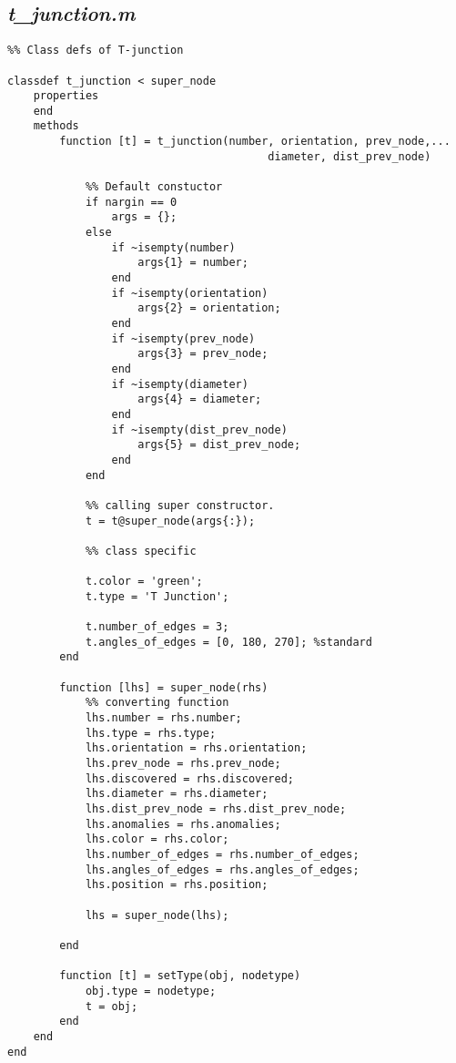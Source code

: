 \subsection{\emph{t\_junction.m}}

\begin{lstlisting}
%% Class defs of T-junction
 
classdef t_junction < super_node
    properties    
    end
    methods
        function [t] = t_junction(number, orientation, prev_node,...
                                        diameter, dist_prev_node)
            
            %% Default constuctor
            if nargin == 0
                args = {};
            else
                if ~isempty(number)
                    args{1} = number;
                end
                if ~isempty(orientation)
                    args{2} = orientation;
                end
                if ~isempty(prev_node)
                    args{3} = prev_node;
                end
                if ~isempty(diameter)
                    args{4} = diameter;
                end
                if ~isempty(dist_prev_node)
                    args{5} = dist_prev_node;
                end
            end
            
            %% calling super constructor.
            t = t@super_node(args{:});
            
            %% class specific
            
            t.color = 'green';
            t.type = 'T Junction';
            
            t.number_of_edges = 3;
            t.angles_of_edges = [0, 180, 270]; %standard  
        end
        
        function [lhs] = super_node(rhs)
            %% converting function
            lhs.number = rhs.number;
            lhs.type = rhs.type;
            lhs.orientation = rhs.orientation;
            lhs.prev_node = rhs.prev_node;
            lhs.discovered = rhs.discovered;
            lhs.diameter = rhs.diameter;
            lhs.dist_prev_node = rhs.dist_prev_node;
            lhs.anomalies = rhs.anomalies;
            lhs.color = rhs.color;
            lhs.number_of_edges = rhs.number_of_edges;
            lhs.angles_of_edges = rhs.angles_of_edges;
            lhs.position = rhs.position;
            
            lhs = super_node(lhs);
            
        end
        
        function [t] = setType(obj, nodetype)
            obj.type = nodetype;
            t = obj;
        end
    end
end
\end{lstlisting}

